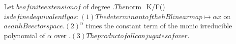 Let $ be a finite extension of $ of degree $. The \text{norm} $_{K/F}(\alpha)$ is defined equivalently as:
(1) The determinant of the hBlinear map  \mapsto \alpha x$ on $ as an hBvector space.
(2) ^n$ times the constant term of the monic irreducible polynomial of $\alpha$ over $.
(3) The product of all conjugates of $\alpha$ over $.

